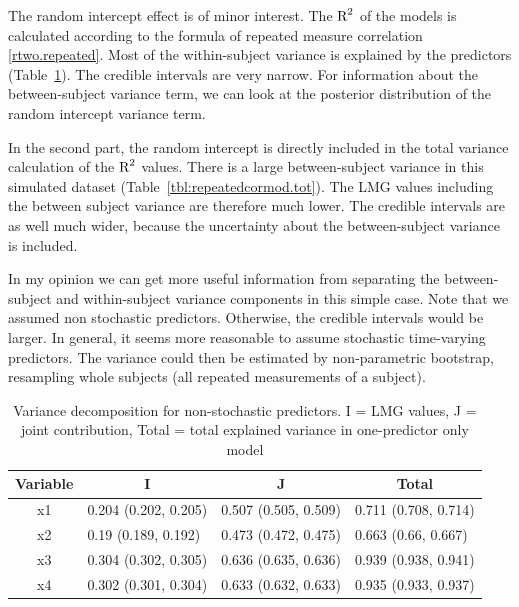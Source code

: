 \documentclass[11pt,a4paper,twoside]{book}\usepackage[]{graphicx}\usepackage[]{color}
\begin{document}
The random intercept effect is of minor interest. The $\text{R}^2$ of the models is calculated according to the formula of repeated measure correlation \eqref{rtwo.repeated}.  Most of the within-subject variance is explained by the predictors (Table~\ref{tbl:repeatedcormod}). The credible intervals are very narrow. For information about the between-subject variance term, we can look at the posterior distribution of the random intercept variance term.

In the second part, the random intercept is directly included in the total variance calculation of the $\text{R}^2$ values. There is a large between-subject variance in this simulated dataset (Table~\ref{tbl:repeatedcormod.tot}). The LMG values including the between subject variance are  therefore much lower. The credible intervals are as well much wider, because the uncertainty about the between-subject variance is included. 

In my opinion we can get more useful information from separating the between-subject and within-subject variance components in this simple case. Note that we assumed non stochastic predictors. Otherwise, the credible intervals would be larger. In general, it seems more reasonable to assume stochastic time-varying predictors. The variance could then be estimated by non-parametric bootstrap, resampling whole subjects (all repeated measurements of a subject).







\begin{table}[h]
\caption{Variance decomposition for non-stochastic predictors. I = LMG values, J = joint contribution, Total = total explained variance in one-predictor only model}
\centering
\begin{tabular}{clll}
  \toprule
  \multicolumn{1}{c}{\textbf{Variable}} & \multicolumn{1}{c}{\textbf{I}} &\multicolumn{1}{c}{\textbf{J}} & \multicolumn{1}{c}{\textbf{Total}} \\
  \hline
x1 & 0.204 (0.202, 0.205)  & 0.507 (0.505, 0.509)   & 0.711 (0.708, 0.714)  \\ 
x2 & 0.19 (0.189, 0.192)  & 0.473 (0.472, 0.475)   & 0.663 (0.66, 0.667)  \\ 
x3 & 0.304 (0.302, 0.305)  & 0.636 (0.635, 0.636)   & 0.939 (0.938, 0.941)  \\ 
x4 & 0.302 (0.301, 0.304)  & 0.633 (0.632, 0.633)   & 0.935 (0.933, 0.937)  \\ 
   \bottomrule
\end{tabular}
\label{tbl:repeatedcormod}
\end{table}
\end{document}
